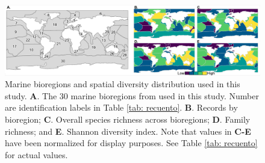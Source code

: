 \documentclass[12pt,authoryear]{elsarticle}
\begin{document}
\begin{figure}
  \centering
  \includegraphics[width=\textwidth]{Fig_1}
   \caption{Marine bioregions and spatial diversity distribution used in this study.  \textsf{ \textbf{A}}. The 30 marine bioregions from \cite{costello2017marine} used in this study. Number are identification labels in Table \ref{tab: recuento}. \textsf{\textbf{B}}. Records by bioregion; \textsf{\textbf{C}}. Overall species richness across bioregions; \textsf{\textbf{D}}. Family richness; and \textsf{\textbf{E}}. Shannon diversity index. Note that values in \textbf{C-E} have been normalized for display purposes. See Table  \ref{tab: recuento} for actual values. }
    \label{fig:Data}
\end{figure}
\end{document}
